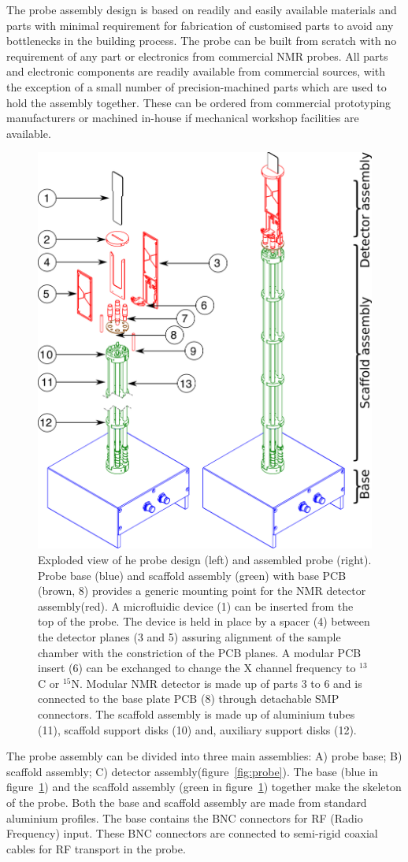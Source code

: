 \documentclass[preprint,12pt]{article}
\begin{document}
The probe assembly design is based on readily and easily available materials and parts with minimal requirement for fabrication of customised parts to avoid any bottlenecks in the building process. The probe can be built from scratch with no requirement of any part or electronics from commercial NMR probes. All parts and electronic components are readily available from commercial sources, with the exception of a small number of precision-machined parts which are used to hold the assembly together. These can be ordered from commercial prototyping manufacturers or machined in-house if mechanical workshop facilities are available.\par
\begin{figure}
\centering
\includegraphics[width=.5\linewidth,keepaspectratio=true]{./figures/ms5n17-tlp-im-181007-Probe-explode.png} 
\caption{Exploded view of he probe design (left) and assembled probe (right). Probe base (blue) and scaffold assembly (green) with base PCB (brown, 8) provides a generic mounting point for the NMR detector assembly(red). A microfluidic device (1) can be inserted from the top of the probe. The device is held in place by a spacer (4) between the detector planes (3 and 5) assuring alignment of the sample chamber with the constriction of the PCB planes. A modular PCB insert (6) can be exchanged to change the X channel frequency to $^{13}$C or $^{15}$N. Modular NMR detector is made up of parts 3 to 6 and is connected to the base plate PCB (8) through detachable SMP connectors. The scaffold assembly is made up of aluminium tubes (11), scaffold support disks (10) and, auxiliary support disks (12).}
\label{fig:probe-explode} 
\end{figure}
The probe assembly can be divided into three main assemblies: A) probe base; B) scaffold assembly; C) detector assembly(figure~\ref{fig:probe}). The  base (blue in figure~\ref{fig:probe-explode}) and the scaffold assembly (green in figure~\ref{fig:probe-explode}) together make the skeleton of the probe. Both the base and scaffold assembly are made from standard aluminium profiles. The base contains the BNC connectors for RF (Radio Frequency) input. These BNC connectors are connected to semi-rigid coaxial cables for RF transport in the probe.\par
\end{document}
